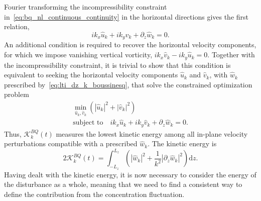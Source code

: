 Fourier transforming the incompressibility constraint in~\eqref{eq:bq_nl_continuous_continuity} in the horizontal directions gives the first relation,
\begin{equation}
    \label{eq:bq_divergence_dz_k}
    ik_{x}\hat{u}_k+ik_{y}\hat{v}_k+\partial_{z}\hat{w}_k = 0.
\end{equation}
An additional condition is required to recover the horizontal velocity components, for which we impose vanishing vertical vorticity, \(ik_{x}\hat{v}_k-ik_{y}\hat{u}_k = 0\). Together with the incompressibility constraint, it is trivial to show that this condition is equivalent to seeking the horizontal velocity components \(\hat{u}_k\) and \(\hat{v}_k\), with \(\hat{w}_k\) prescribed by~\eqref{eq:lti_dz_k_boussinesq}, that solve the constrained optimization problem
\begin{equation}
    \label{eq:bq_kinetic_minimization}
    \begin{gathered}
        \min_{\hat{u}_k,\hat{v}_k}\left(|\hat{u}_k|^{2}+|\hat{v}_k|^{2}\right)\\
        \text{subject to}\quad ik_{x}\hat{u}_k+ik_{y}\hat{v}_k+\partial_{z}\hat{w}_k = 0.
    \end{gathered}
\end{equation}
Thus, \(\mathcal{K}_k^{BQ}(t)\) measures the lowest kinetic energy among all in-plane velocity perturbations compatible with a prescribed \(\hat{w}_k\). The kinetic energy is
\begin{equation}
    \label{eq:bq_kinetic_energy_reduced_dz_k}
    2\mathcal{K}_k^{BQ}(t) = \int_{-L_z}^{L_z}\left(|\hat{w}_k|^{2} + \frac{1}{k^{2}}\left|\partial_{z}\hat{w}_k\right|^{2}\right)\mathrm{d}z.
\end{equation}
Having dealt with the kinetic energy, it is now necessary to consider the energy of the disturbance as a whole, meaning that we need to find a consistent way to define the contribution from the concentration fluctuation.

